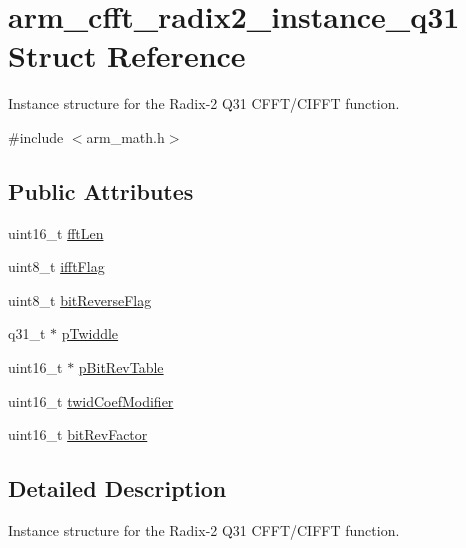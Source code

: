\hypertarget{structarm__cfft__radix2__instance__q31}{\section{arm\-\_\-cfft\-\_\-radix2\-\_\-instance\-\_\-q31 Struct Reference}
\label{structarm__cfft__radix2__instance__q31}
}


Instance structure for the Radix-\/2 Q31 C\-F\-F\-T/\-C\-I\-F\-F\-T function.  




{\ttfamily \#include $<$arm\-\_\-math.\-h$>$}

\subsection*{Public Attributes}
\begin{DoxyCompactItemize}
\item 
uint16\-\_\-t \hyperlink{structarm__cfft__radix2__instance__q31_a960199f1373a192366878ef279eab00f}{fft\-Len}
\item 
uint8\-\_\-t \hyperlink{structarm__cfft__radix2__instance__q31_a2607378ce64be16698bb8a3b1af8d3c8}{ifft\-Flag}
\item 
uint8\-\_\-t \hyperlink{structarm__cfft__radix2__instance__q31_a6239b8d268285334e88c008c07d68616}{bit\-Reverse\-Flag}
\item 
q31\-\_\-t $\ast$ \hyperlink{structarm__cfft__radix2__instance__q31_a1d5bbe9a991e133f81652a77a7985d23}{p\-Twiddle}
\item 
uint16\-\_\-t $\ast$ \hyperlink{structarm__cfft__radix2__instance__q31_ada8e5264f4b22ff4c621817978994674}{p\-Bit\-Rev\-Table}
\item 
uint16\-\_\-t \hyperlink{structarm__cfft__radix2__instance__q31_ae63ca9193322cd477970c1d2086407d1}{twid\-Coef\-Modifier}
\item 
uint16\-\_\-t \hyperlink{structarm__cfft__radix2__instance__q31_a9d17a87263953fe3559a007512c9f3a4}{bit\-Rev\-Factor}
\end{DoxyCompactItemize}


\subsection{Detailed Description}
Instance structure for the Radix-\/2 Q31 C\-F\-F\-T/\-C\-I\-F\-F\-T function. 

